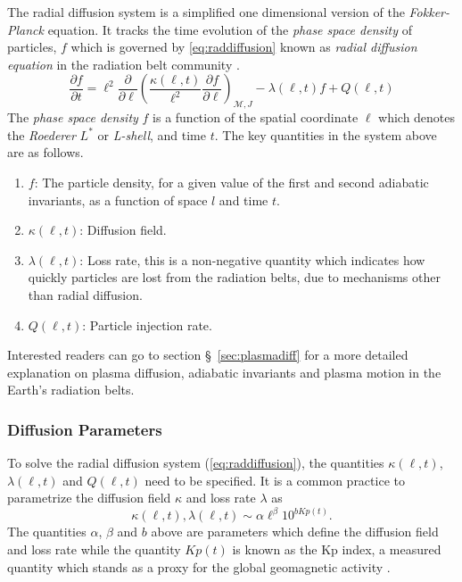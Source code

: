 The radial diffusion system is a simplified one dimensional version of the \emph{Fokker-Planck} 
equation. It tracks the time evolution of the \emph{phase space density} of particles, $f$ which is 
governed by \cref{eq:raddiffusion} known as \emph{radial diffusion equation} in the radiation belt 
community \citep{JGRA:JGRA9345}.
%
\begin{equation}\label{eq:raddiffusion}
  \frac{\partial{f}}{\partial{t}} = \ell^2 \frac{\partial}{\partial{\ell}} \left( 
    \frac{\kappa(\ell, t)}{\ell^{2}} \frac{\partial{f}}{\partial{\ell}}
  \right)_{\mathcal{M}, J} - \lambda(\ell, t) f + Q(\ell, t)
\end{equation}
%
The \emph{phase space density} $f$ is a function of the spatial coordinate $\ell$ which denotes the 
\emph{Roederer} $L^*$ or \emph{L-shell}, and time $t$. The key quantities in the system above are 
as follows.
%
\begin{enumerate}
\item $f$: The particle density, for a given value of the first and second adiabatic invariants, 
as a function of space $l$ and time $t$.
\item $\kappa(\ell, t)$: Diffusion field.
\item $\lambda(\ell, t)$: Loss rate, this is a non-negative quantity which indicates how quickly 
particles are lost from the radiation belts, due to mechanisms other than radial diffusion.
\item $Q(\ell, t)$: Particle injection rate.
\end{enumerate}
%
Interested readers can go to section \S~\ref{sec:plasmadiff} for a more detailed explanation on 
plasma diffusion, adiabatic invariants and plasma motion in the Earth's radiation belts. 

\subsubsection*{Diffusion Parameters}

To solve the radial diffusion system (\cref{eq:raddiffusion}), the quantities $\kappa(\ell, t)$, 
$\lambda(\ell, t)$ and $Q(\ell, t)$ need to be specified. It is a common practice 
\citetext{see \citealp{GRL:GRL10762}, \citealp{JGRA:JGRA15067}, \citealp{JGRA:JGRA18021} and
\citealp{GRL:GRL22815}} to parametrize the diffusion field $\kappa$ and loss rate $\lambda$ as 
%
\begin{equation}\label{eq:paramExp}
  \kappa(\ell, t), \lambda(\ell, t) \sim \alpha \ell^{\beta} 10^{b Kp(t)}.
\end{equation}
%
The quantities $\alpha$, $\beta$ and $b$ above are parameters which define the diffusion field and 
loss rate while the quantity $Kp(t)$ is known as the Kp index, a measured quantity which stands as 
a proxy for the global geomagnetic activity \citep{BartelsKp}.



